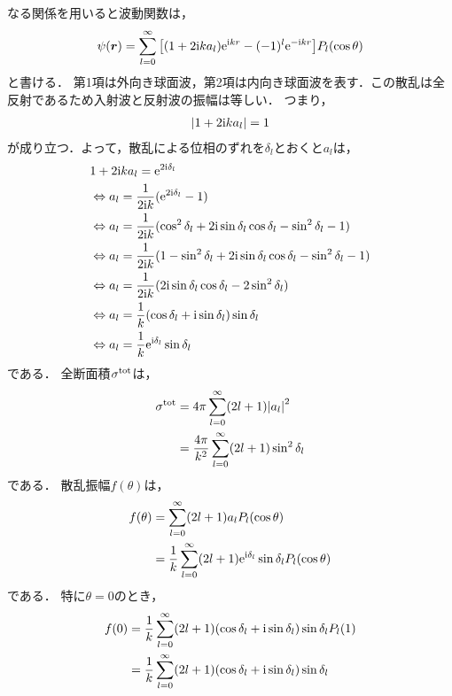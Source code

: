 \documentclass{report}
\begin{document}
  なる関係を用いると波動関数は，
  \begin{align}
    \psi(\bm{r}) = \sum_{l = 0}^{\infty} \qty[\qty(1 + 2\mathrm{i} ka_l)\mathrm{e}^{\mathrm{i} kr} - (-1)^l \mathrm{e}^{-\mathrm{i} kr}]P_l(\cos\theta)\label{SCPartialWave}
  \end{align}
  と書ける．
  第1項は外向き球面波，第2項は内向き球面波を表す．この散乱は全反射であるため入射波と反射波の振幅は等しい．
  つまり，
  \begin{align}
    \abs{1 + 2\mathrm{i} ka_l} = 1
  \end{align}
  が成り立つ．よって，散乱による位相のずれを$\delta_l$とおくと$a_l$は，
  \begin{align}
    &1 + 2\mathrm{i} ka_l = \mathrm{e}^{2\mathrm{i} \delta_l} \\ 
    &\Leftrightarrow a_l = \frac{1}{2\mathrm{i} k}(\mathrm{e}^{2\mathrm{i} \delta_l} - 1) \\
    &\Leftrightarrow a_l = \frac{1}{2\mathrm{i} k}(\cos^2\delta_l + 2\mathrm{i}\sin\delta_l\cos\delta_l - \sin^2\delta_l - 1) \\
    &\Leftrightarrow a_l = \frac{1}{2\mathrm{i} k}(1 - \sin^2\delta_l + 2\mathrm{i}\sin\delta_l\cos\delta_l - \sin^2\delta_l - 1) \\
    &\Leftrightarrow a_l = \frac{1}{2\mathrm{i} k}(2\mathrm{i}\sin\delta_l\cos\delta_l - 2\sin^2\delta_l) \\
    &\Leftrightarrow a_l = \frac{1}{k}(\cos\delta_l + \mathrm{i}\sin\delta_l)\sin\delta_l\\
    &\Leftrightarrow a_l = \frac{1}{k}\mathrm{e}^{\mathrm{i} \delta_l} \sin \delta_l
  \end{align}
  である．
  全断面積$\sigma^{\mathrm{tot}}$は，
  \begin{align}
    \sigma^{\mathrm{tot}} &= 4\pi \sum_{l=0}^{\infty} (2l + 1)\abs{a_l}^2 \\
    &= \frac{4\pi}{k^2} \sum_{l=0}^{\infty} (2l + 1)\sin^2\delta_l 
  \end{align}
  である．
  散乱振幅$f(\theta)$は，
  \begin{align}
    f(\theta) &= \sum_{l = 0}^{\infty} (2l + 1)a_lP_l(\cos\theta) \\
    &= \frac{1}{k} \sum_{l = 0}^{\infty}(2l + 1)\mathrm{e}^{\mathrm{i}\delta_l}\sin\delta_lP_l(\cos\theta)
  \end{align}
  である．
  特に$\theta = 0$のとき，
  \begin{align}
    f(0) &= \frac{1}{k} \sum_{l = 0}^{\infty} (2l + 1) (\cos\delta_l + \mathrm{i} \sin\delta_l)\sin\delta_l P_l(1) \\ 
    &= \frac{1}{k} \sum_{l = 0}^{\infty} (2l + 1) (\cos\delta_l + \mathrm{i} \sin\delta_l)\sin\delta_l
  \end{align}
\end{document}

